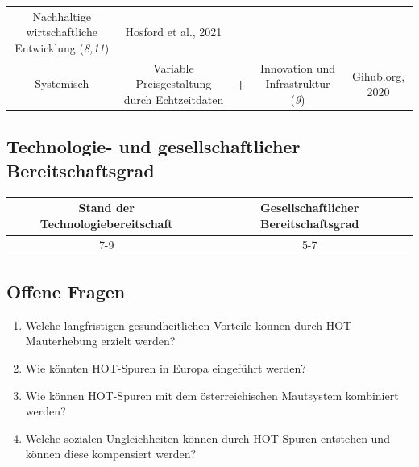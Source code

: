 \documentclass[
]{book}
\providecommand{\tightlist}{%
  \setlength{\itemsep}{0pt}\setlength{\parskip}{0pt}}
\begin{document}
\begin{longtable}[]{@{}ccccc@{}}
\begin{minipage}[t]{0.17\columnwidth}
Nachhaltige wirtschaftliche Entwicklung (\emph{8,11})\strut
\end{minipage} & \begin{minipage}[t]{0.17\columnwidth}\centering
Hosford et al., 2021\strut
\end{minipage}\tabularnewline
\begin{minipage}[t]{0.17\columnwidth}\centering
Systemisch\strut
\end{minipage} & \begin{minipage}[t]{0.16\columnwidth}\centering
Variable Preisgestaltung durch Echtzeitdaten\strut
\end{minipage} & \begin{minipage}[t]{0.17\columnwidth}\centering
\textbf{+}\strut
\end{minipage} & \begin{minipage}[t]{0.17\columnwidth}\centering
Innovation und Infrastruktur (\emph{9})\strut
\end{minipage} & \begin{minipage}[t]{0.17\columnwidth}\centering
Gihub.org, 2020\strut
\end{minipage}\tabularnewline
\bottomrule
\end{longtable}

\hypertarget{technologie--und-gesellschaftlicher-bereitschaftsgrad-2}{%
\subsection*{Technologie- und gesellschaftlicher Bereitschaftsgrad}\label{technologie--und-gesellschaftlicher-bereitschaftsgrad-2}}

\begin{longtable}[]{@{}cc@{}}
\toprule
Stand der Technologiebereitschaft & Gesellschaftlicher Bereitschaftsgrad\tabularnewline
\midrule
\endhead
7-9 & 5-7\tabularnewline
\bottomrule
\end{longtable}

\hypertarget{offene-fragen-4}{%
\subsection*{Offene Fragen}\label{offene-fragen-4}}

\begin{enumerate}
\def\labelenumi{\arabic{enumi}.}
\tightlist
\item
  Welche langfristigen gesundheitlichen Vorteile können durch HOT-Mauterhebung erzielt werden?
\item
  Wie könnten HOT-Spuren in Europa eingeführt werden?
\item
  Wie können HOT-Spuren mit dem österreichischen Mautsystem kombiniert werden?
\item
  Welche sozialen Ungleichheiten können durch HOT-Spuren entstehen und können diese kompensiert werden?
\end{enumerate}
\end{document}
